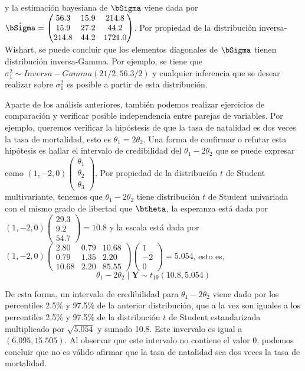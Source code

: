 \documentclass[10pt,openright]{book}\usepackage[]{graphicx}\usepackage[]{color}
\begin{document}
\begin{Eje}
y la estimaci\'on bayesiana de $\bSigma$ viene dada por $\hat{\bSigma}=\begin{pmatrix}56.3&15.9&214.8\\15.9&27.2&44.2\\214.8&44.2&1721.0\end{pmatrix}$. Por propiedad de la distribuci\'on inversa-Wishart, se puede concluir que los elementos diagonales de $\bSigma$ tienen distribuci\'on inversa-Gamma. Por ejemplo, se tiene que $\sigma^2_{1}\sim Inversa-Gamma(21/2, 56.3/2)$ y cualquier inferencia que se desear realizar sobre $\sigma^2_{1}$ es posible a partir de esta distribuci\'on. 

Aparte de los an\'alisis anteriores, tambi\'en podemos realizar ejercicios de comparaci\'on y verificar posible independencia entre parejas de variables. Por ejemplo, queremos verificar la hip\'ostesis de que la tasa de natalidad es dos veces la tasa de mortalidad, esto es $\theta_1=2\theta_2$. Una forma de confirmar o refutar esta hip\'otesis es hallar el intervalo de credibilidad del $\theta_1-2\theta_2$ que se puede expresar como $(1,-2,0)\begin{pmatrix}\theta_1\\ \theta_2\\ \theta_3\end{pmatrix}$. Por propiedad de la distribuci\'on $t$ de Student multivariante, tenemos que $\theta_1-2\theta_2$ tiene distribuci\'on $t$ de Student univariada con el mismo grado de libertad que $\btheta$, la esperanza est\'a dada por $(1,-2,0)\begin{pmatrix}29.3\\9.2\\54.7\end{pmatrix}=10.8$ y la escala est\'a dada por $(1,-2,0)\begin{pmatrix}2.80&0.79&10.68\\0.79&1.35&2.20\\10.68&2.20&85.55\end{pmatrix}\begin{pmatrix}1\\-2\\0\end{pmatrix}=5.054$, esto es, 
\begin{equation*}
\theta_1-2\theta_2 \mid \mathbf{Y}\sim t_{19}(10.8, 5.054)
\end{equation*}

De esta forma, un intervalo de credibilidad para $\theta_1-2\theta_2$ viene dado por los percentiles 2.5\% y 97.5\% de la anterior distribuci\'on, que a la vez son iguales a los percentiles 2.5\% y 97.5\% de la distribuci\'on $t$ de Student estandarizada multiplicado por $\sqrt{5.054}$ y sumado 10.8. Este invervalo es igual a $(6.095, 15.505)$. Al observar que este intervalo no contiene el valor 0, podemos concluir que no es v\'alido afirmar que la tasa de natalidad sea dos veces la tasa de mortalidad.


\end{Eje}
\end{document}
